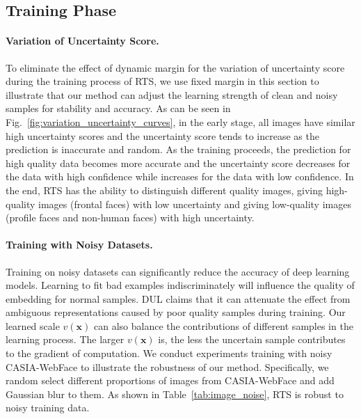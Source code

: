 \documentclass[letterpaper]{article} %
\begin{document}
\subsection{Training Phase}
\label{ssec:training phase}

\paragraph{Variation of Uncertainty Score.}
To eliminate the effect of dynamic margin for the variation of uncertainty score during the training process of RTS, we use fixed margin in this section to illustrate that our method can adjust the learning strength of clean and noisy samples for stability and accuracy.
As can be seen in Fig.~\ref{fig:variation_uncertainty_curves}, in the early stage, all images have similar high uncertainty scores and the uncertainty score tends to increase as the prediction is inaccurate and random. As the training proceeds, the prediction for high quality data becomes more accurate and the uncertainty score decreases for the data with high confidence while increases for the data with low confidence. In the end, RTS has the ability to distinguish different quality images, giving high-quality images (frontal faces) with low uncertainty and giving low-quality images (profile faces and non-human faces) with high uncertainty.

\paragraph{Training with Noisy Datasets.}
Training on noisy datasets can significantly reduce the accuracy of deep learning models. Learning to fit bad examples indiscriminately will influence the quality of embedding for normal samples.
%
DUL claims that it can attenuate the effect from ambiguous representations caused by poor quality samples during training. Our learned scale $v(\bm{x})$ can also balance the contributions of different samples in the learning process. The larger $v(\bm{x})$ is, the less the uncertain sample contributes to the gradient of computation.
We conduct experiments training with noisy CASIA-WebFace to illustrate the robustness of our method. Specifically, we random select different proportions of images from CASIA-WebFace and add Gaussian blur to them. As shown in Table~\ref{tab:image_noise}, RTS is robust to noisy training data.
\end{document}
